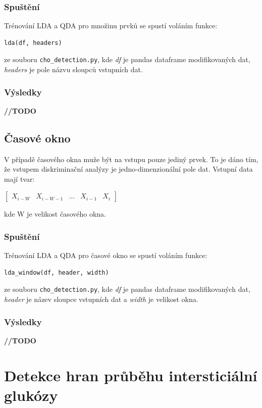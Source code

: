 \subsubsection{Spuštění}

Trénování LDA a QDA pro množinu prvků se spustí voláním funkce:
\begin{verbatim}
lda(df, headers)
\end{verbatim}
ze souboru \texttt{cho\_detection.py}, kde \textit{df} je pandas dataframe modifikovaných dat, \textit{headers} je pole názvu sloupců vstupních dat.

\subsubsection{Výsledky}

\textbf{//TODO}

\subsection{Časové okno}

V případě časového okna muže být na vstupu pouze jediný prvek. To je dáno tím, že vstupem diskriminační analýzy je jedno-dimenzionální pole dat. Vstupní data mají tvar:

$\begin{bmatrix}
X_{i-W} & X_{i-W-1} & ... & X_{i-1} & X_{i}
\end{bmatrix}$

\noindent kde W je velikost časového okna.

\subsubsection{Spuštění}

Trénování LDA a QDA pro časové okno se spustí voláním funkce:
\begin{verbatim}
lda_window(df, header, width)
\end{verbatim}
ze souboru \texttt{cho\_detection.py}, kde \textit{df} je pandas dataframe modifikovaných dat, \textit{header} je název sloupce vstupních dat a \textit{width} je velikost okna.

\subsubsection{Výsledky}

\textbf{//TODO}


\section{Detekce hran průběhu intersticiální glukózy}
\label{ch:threshold}


